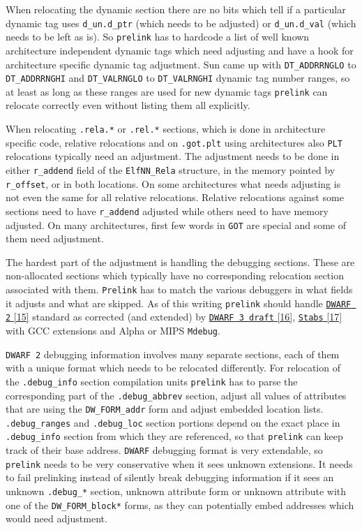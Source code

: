 \documentclass[twoside]{article}
\def\tts#1{\texttt{\small #1}}
\begin{document}
When relocating the dynamic section there are no bits which tell if
a particular dynamic tag uses \tts{d\_un.d\_ptr} (which needs to
be adjusted) or \tts{d\_un.d\_val} (which needs to be left as is).
So \tts{prelink} has to hardcode a list of well known architecture
independent dynamic tags which need adjusting and have a hook for
architecture specific dynamic tag adjustment.  Sun came up with
\tts{DT\_ADDRRNGLO} to \tts{DT\_ADDRRNGHI} and \tts{DT\_VALRNGLO}
to \tts{DT\_VALRNGHI} dynamic tag number ranges, so at least as
long as these ranges are used for new dynamic tags \tts{prelink}
can relocate correctly even without listing them all explicitly.

When relocating \tts{.rela.*} or \tts{.rel.*} sections, which is
done in architecture specific code, relative relocations and on \tts{.got.plt}
using architectures also \tts{PLT} relocations typically need an
adjustment.  The adjustment needs to be done in either \tts{r\_addend} field
of the \tts{ElfNN\_Rela} structure, in the memory pointed by \tts{r\_offset},
or in both locations.
On some architectures what needs adjusting is not even the same for all relative relocations.
Relative relocations against some sections need to have \tts{r\_addend}
adjusted while others need to have memory adjusted.
On many architectures, first few words in \tts{GOT} are special and some
of them need adjustment.

The hardest part of the adjustment is handling the debugging sections.
These are non-allocated sections which typically have no corresponding
relocation section associated with them.  \tts{Prelink} has to match the various
debuggers in what fields it adjusts and what are skipped.
As of this writing \tts{prelink} should handle
\href{http://www.eagercon.com/dwarf/dwarf-2.0.0.pdf}%
{\tts{DWARF 2} [15]} standard as corrected (and extended) by
\href{http://reality.sgiweb.org/davea/dwarf3-draft8-011125.pdf}%
{\tts{DWARF 3 draft} [16]},
\href{http://sources.redhat.com/cgi-bin/cvsweb.cgi/src/gdb/doc/stabs.texinfo?cvsroot=src}%
{\tts{Stabs} [17]} with GCC extensions and Alpha or MIPS \tts{Mdebug}.

\tts{DWARF 2} debugging information involves many separate sections,
each of them with a unique format which needs to be relocated differently.
For relocation of the \tts{.debug\_info} section compilation units \tts{prelink} has to
parse the corresponding part of the \tts{.debug\_abbrev} section, adjust all
values of attributes that are using the \tts{DW\_FORM\_addr} form and adjust embedded
location lists.  \tts{.debug\_ranges} and \tts{.debug\_loc} section
portions depend on the exact place in \tts{.debug\_info} section from
which they are referenced, so that \tts{prelink} can keep track of their
base address.  \tts{DWARF} debugging format is very extendable, so
\tts{prelink} needs to be very conservative when it sees unknown extensions.
It needs to fail prelinking instead of silently break debugging information
if it sees an unknown \tts{.debug\_*} section, unknown attribute form
or unknown attribute with one of the \tts{DW\_FORM\_block*} forms, as
they can potentially embed addresses which would need adjustment.
\end{document}
